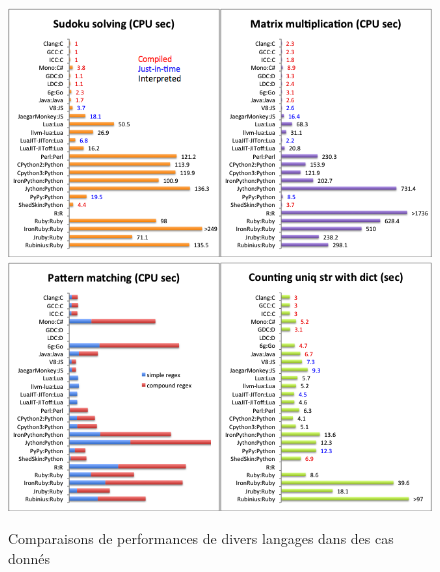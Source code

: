 \documentclass[a4paper]{memoir}
\begin{document}
			\begin{figure}
				\begin{center}
					\includegraphics[scale=0.5]{img/AnalyseLangage1.png}
					\includegraphics[scale=0.5]{img/AnalyseLangage2.png} 
				\end{center}
				\label{fig:analyse}
				\caption{Comparaisons de performances de divers langages dans des cas donnés}
			\end{figure}
			
\end{document}
